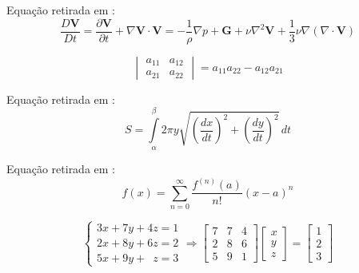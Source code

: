 \begin{prob}
\label{prob13}
Equação retirada em \cite{Balino}:
\begin{equation*}
     \frac{D\mathbf{V}}{Dt} = \frac{\partial \mathbf{V}}{\partial t} + \nabla \mathbf{V}\cdot \mathbf{V} = -\frac{1}{\rho}\nabla p + \mathbf{G} + \nu\nabla^{2}\mathbf{V} + \frac{1}{3}\nu\nabla (\nabla\cdot\mathbf{V})
\end{equation*}
\end{prob}

\begin{prob}
\label{prob14}
\begin{equation*}
     \begin{vmatrix}
                a_{11} & a_{12} \\
                a_{21} & a_{22}
            \end{vmatrix}
            = a_{11}a_{22} - a_{12}a_{21}
\end{equation*}
\end{prob}

\begin{prob}
\label{prob15}
Equação retirada em \cite{stewart2013calculo}:
\begin{equation*}
      S = \int\limits_{\alpha}^{\beta} 2\pi y\sqrt{\left(\dfrac{dx}{dt}\right)^{2} + \left(\dfrac{dy}{dt}\right)^{2}} \, dt
\end{equation*}
\end{prob}

\begin{prob}
\label{prob16}
Equação retirada em \cite{stewart2013calculo}:
\begin{equation*}
      f(x) = \sum_{n=0}^{\infty}\frac{f^{(n)}(a)}{n!}(x-a)^{n}
\end{equation*}
\end{prob}

\begin{prob}
\label{prob17}
\begin{equation*}
      \begin{cases}
                3x+7y+4z = 1\\
                2x+8y+6z = 2 \\
                5x+9y+\phantom{1}z=3
            \end{cases}
            \Rightarrow
            \begin{bmatrix}
                7 & 7 & 4\\
                2 & 8 & 6\\
                5 & 9 & 1
            \end{bmatrix}
            \begin{bmatrix}
                x \\
                y \\
                z
            \end{bmatrix}
            =
            \begin{bmatrix}
                1 \\
                2 \\
                3
            \end{bmatrix}
\end{equation*}
\end{prob}